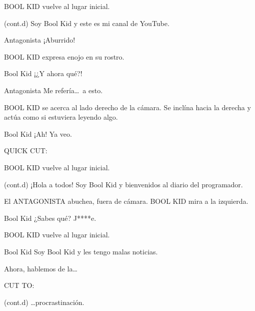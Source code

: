 \documentclass{screenplay}[2018/01/07]
\begin{document}
    BOOL KID vuelve al lugar inicial.

    \begin{dialogue}{(cont.d)}
        Soy Bool Kid y este es mi canal de YouTube.
    \end{dialogue}

    \begin{dialogue}{Antagonista}
        ¡Aburrido!
    \end{dialogue}

    BOOL KID expresa enojo en su rostro.

    \begin{dialogue}{Bool Kid}
        ¡¿Y ahora qué?!
    \end{dialogue}

    \begin{dialogue}{Antagonista}
        Me refería\dots\ a esto.
    \end{dialogue}

    BOOL KID se acerca al lado derecho de la cámara. Se inclína hacia la derecha
    y actúa como si estuviera leyendo algo.

    \begin{dialogue}{Bool Kid}
        ¡Ah! Ya veo.
    \end{dialogue}

    \begin{flushright}
        QUICK CUT:
    \end{flushright}

    BOOL KID vuelve al lugar inicial.

    \begin{dialogue}{(cont.d)}
        ¡Hola a todos! Soy Bool Kid y bienvenidos al diario del programador.
    \end{dialogue}

    El ANTAGONISTA abuchea, fuera de cámara.
    BOOL KID mira a la izquierda.

    \begin{dialogue}[shouting]{Bool Kid}
        ¿Sabes qué? J****e.
    \end{dialogue}

    BOOL KID vuelve al lugar inicial.

    \begin{dialogue}{Bool Kid}
        Soy Bool Kid y les tengo malas noticias.

        Ahora, hablemos de la\dots
    \end{dialogue}

    \begin{flushright}
        CUT TO:
    \end{flushright}


    \begin{dialogue}{(cont.d)}
        \dots procrastinación.
    \end{dialogue}
    \fadeout

    \theend
\end{document}
